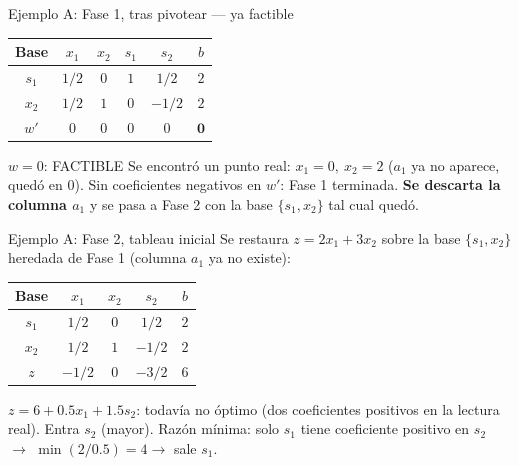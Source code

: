 \documentclass[aspectratio=169]{beamer}
\begin{document}
\begin{frame}{Ejemplo A: Fase 1, tras pivotear --- ya factible}
\begin{center}
\renewcommand{\arraystretch}{1.25}
\begin{tabular}{c|cccc|c}
\textbf{Base} & $x_1$ & $x_2$ & $s_1$ & $s_2$ & $b$ \\
\hline
$s_1$ & $1/2$ & $0$ & $1$ & $1/2$ & $2$ \\
$x_2$ & $1/2$ & $1$ & $0$ & $-1/2$ & $2$ \\
\hline
$w'$ & $0$ & $0$ & $0$ & $0$ & $\mathbf{0}$ \\
\end{tabular}
\end{center}

\begin{alertblock}{$w=0$: FACTIBLE}
Se encontró un punto real: $x_1=0,\ x_2=2$ ($a_1$ ya no aparece, quedó en $0$). Sin coeficientes negativos en $w'$: Fase 1 terminada. \textbf{Se descarta la columna $a_1$} y se pasa a Fase 2 con la base $\{s_1,x_2\}$ tal cual quedó.
\end{alertblock}
\end{frame}

\begin{frame}{Ejemplo A: Fase 2, tableau inicial}
Se restaura $z=2x_1+3x_2$ sobre la base $\{s_1,x_2\}$ heredada de Fase 1 (columna $a_1$ ya no existe):

\begin{center}
\renewcommand{\arraystretch}{1.25}
\begin{tabular}{c|ccc|c}
\textbf{Base} & $x_1$ & $x_2$ & $s_2$ & $b$ \\
\hline
$s_1$ & $1/2$ & $0$ & $1/2$ & $2$ \\
$x_2$ & $1/2$ & $1$ & $-1/2$ & $2$ \\
\hline
$z$ & \cellcolor{entra!20}$-1/2$ & $0$ & $-3/2$ & $6$ \\
\end{tabular}
\end{center}

$z=6+0.5x_1+1.5s_2$: todavía no óptimo (dos coeficientes positivos en la lectura real). Entra $s_2$ (mayor). Razón mínima: solo $s_1$ tiene coeficiente positivo en $s_2$ $\to$ $\min(2/0.5)=4\to$ sale $s_1$.
\end{frame}
\end{document}
